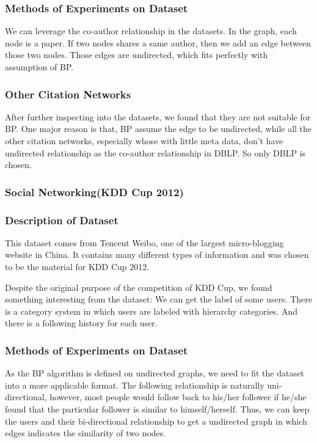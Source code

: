 \subsubsection*{Methods of Experiments on Dataset}
We can leverage the co-author relationship in the datasets. In the graph, each node is a paper. If two nodes shares a same author, then we add an edge between those two nodes. Those edges are undirected, which fits perfectly with assumption of BP.
\subsubsection*{Other Citation Networks}
After further inspecting into the datasets, we found that they are not suitable for BP. One major reason is that, BP assume the edge to be undirected, while all the other citation networks, especially whose with little meta data, don't have undirected relationship as the co-author relationship in DBLP. So only DBLP is chosen.

\subsubsection{Social Networking(KDD Cup 2012)}

\subsubsection*{Description of Dataset}
This dataset comes from Tencent Weibo, one of the largest micro-blogging website in China.
It contains many different types of information and was chosen to be the material for KDD Cup 2012.

Despite the original purpose of the competition of KDD Cup, we found something interesting from the dataset:
We can get the label of some users. There is a category system in which users are labeled with hierarchy categories. And there is a following history for each user.

\subsubsection*{Methods of Experiments on Dataset}
As the BP algorithm is defined on undirected graphs, we need to fit the dataset into a more applicable format.
The following relationship is naturally uni-directional, however, most people would follow back to his/her follower if he/she found that the particular follower is similar to himself/herself.
Thus, we can keep the users and their bi-directional relationship to get a undirected graph in which edges indicates the similarity of two nodes.

